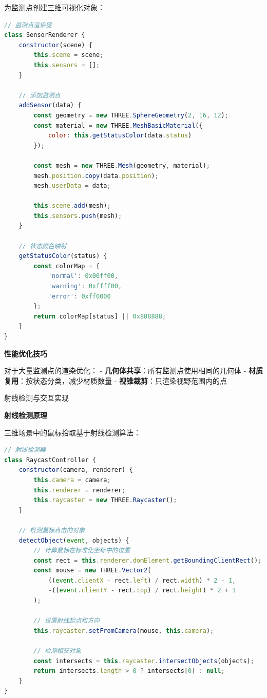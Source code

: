 为监测点创建三维可视化对象：

\begin{lstlisting}[language=Javascript]
// 监测点渲染器
class SensorRenderer {
    constructor(scene) {
        this.scene = scene;
        this.sensors = [];
    }
    
    // 添加监测点
    addSensor(data) {
        const geometry = new THREE.SphereGeometry(2, 16, 12);
        const material = new THREE.MeshBasicMaterial({
            color: this.getStatusColor(data.status)
        });
        
        const mesh = new THREE.Mesh(geometry, material);
        mesh.position.copy(data.position);
        mesh.userData = data;
        
        this.scene.add(mesh);
        this.sensors.push(mesh);
    }
    
    // 状态颜色映射
    getStatusColor(status) {
        const colorMap = {
            'normal': 0x00ff00,
            'warning': 0xffff00, 
            'error': 0xff0000
        };
        return colorMap[status] || 0x888888;
    }
}
\end{lstlisting}

\textbf{性能优化技巧}

对于大量监测点的渲染优化： - \textbf{几何体共享}：所有监测点使用相同的几何体 - \textbf{材质复用}：按状态分类，减少材质数量 - \textbf{视锥裁剪}：只渲染视野范围内的点

 射线检测与交互实现

\textbf{射线检测原理}

三维场景中的鼠标拾取基于射线检测算法：

\begin{lstlisting}[language=Javascript]
// 射线检测器
class RaycastController {
    constructor(camera, renderer) {
        this.camera = camera;
        this.renderer = renderer;
        this.raycaster = new THREE.Raycaster();
    }
    
    // 检测鼠标点击的对象
    detectObject(event, objects) {
        // 计算鼠标在标准化坐标中的位置
        const rect = this.renderer.domElement.getBoundingClientRect();
        const mouse = new THREE.Vector2(
            ((event.clientX - rect.left) / rect.width) * 2 - 1,
            -((event.clientY - rect.top) / rect.height) * 2 + 1
        );
        
        // 设置射线起点和方向
        this.raycaster.setFromCamera(mouse, this.camera);
        
        // 检测相交对象
        const intersects = this.raycaster.intersectObjects(objects);
        return intersects.length > 0 ? intersects[0] : null;
    }
}
\end{lstlisting}

